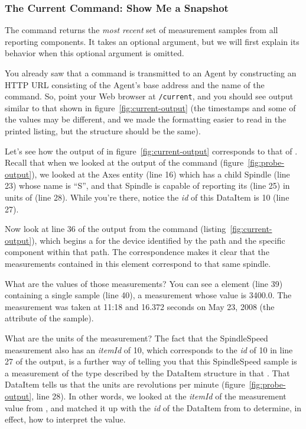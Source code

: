 \subsubsection{The Current Command: Show Me a Snapshot}
\label{sec:cmd:current}



The command  returns the \emph{most recent} set of measurement
samples from all reporting components.  It takes an optional argument,
but we will first explain its behavior when this optional argument is
omitted. 

You already saw that a command is transmitted to an Agent by
constructing an HTTP URL consisting of the Agent's base address and the
name of the command.  So, point your Web browser at
\texttt{\agenturl/current}, and you should see output similar to that
shown in figure~\ref{fig:current-output} (the timestamps and some of the
values may be different, and we made the formatting easier to read in
the printed listing, but the structure should be the same).

Let's see how the output of  in
figure~\ref{fig:current-output} corresponds to that of .
Recall that when we looked at the output of the  command
(figure~\ref{fig:probe-output}), we looked at the Axes entity (line 16)
which has a child Spindle (line 23) whose name is ``S'', and that
Spindle is capable of reporting its   (line
25) in units of  (line 28). While you're there,
notice the \emph{id} of this DataItem is 10 (line 27).

Now look at line 36 of the output from the  command
(listing~\ref{fig:current-output}), 
which begins a  for the device identified by the
path  and the specific
component  within that path.  The correspondence makes it clear
that the measurements contained in this  element
correspond to that same spindle.

What are the values of those measurements?  You can see a 
element (line 39) 
containing a single sample (line 40),  a 
measurement whose value is 3400.0.   The measurement was taken at
11:18 and 16.372 seconds on May 23, 2008 (the  attribute of
the  sample).  


What are the units of the measurement?  The fact that the SpindleSpeed 
measurement also has an \emph{itemId} of 10, which corresponds to the
\emph{id} of 10 in line 27 of the  output, is a further way
of telling you that this SpindleSpeed sample is a measurement of the
type described by the DataItem structure in that .  That
DataItem tells us that
the units 
are revolutions per minute (figure~\ref{fig:probe-output}, line 28).
In other words, we looked at the \emph{itemId} of the measurement value
from , and matched it up with the \emph{id} of the
DataItem from   to determine, in effect, how to interpret
the value.

